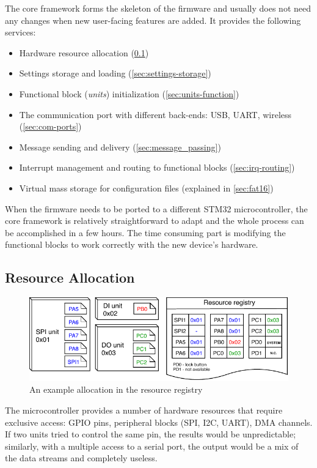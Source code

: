 The core framework forms the skeleton of the firmware and usually does not need any changes when new user-facing features are added. It provides the following services:

\begin{itemize}
	\item Hardware resource allocation (\cref{sec:res-allocation})
	\item Settings storage and loading (\cref{sec:settings-storage})
	\item Functional block (\textit{units}) initialization (\cref{sec:units-function})
	\item The communication port with different back-ends: \gls{USB}, \gls{UART}, wireless (\cref{sec:com-ports})
	\item Message sending and delivery (\cref{sec:message_passing})
	\item Interrupt management and routing to functional blocks (\cref{sec:irq-routing})
	\item Virtual mass storage for configuration files (explained in \cref{sec:fat16})
\end{itemize}

When the firmware needs to be ported to a different STM32 microcontroller, the core framework is relatively straightforward to adapt and the whole process can be accomplished in a few hours. The time consuming part is modifying the functional blocks to work correctly with the new device's hardware.


\subsection{Resource Allocation} \label{sec:res-allocation}

\begin{figure}[h]
	\centering
	\includegraphics[scale=1] {img/resource-repository.pdf}
	\caption{\label{fig:resource-repository}An example allocation in the resource registry}
\end{figure}

The microcontroller provides a number of hardware resources that require exclusive access: GPIO pins, peripheral blocks (\gls{SPI}, \gls{I2C}, \gls{UART}\textellipsis), \gls{DMA} channels. If two units tried to control the same pin, the results would be unpredictable; similarly, with a multiple access to a serial port, the output would be a mix of the data streams and completely useless.

